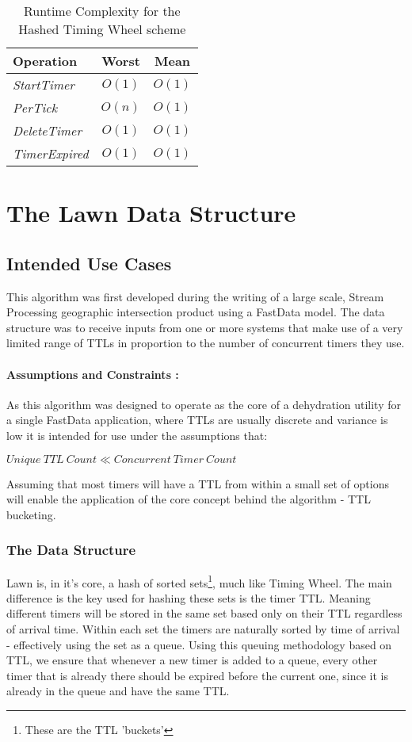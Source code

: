 \documentclass[twocolumn,a4paper]{article}
\newcommand{\advcomplexity}[9]{
\begin{table}[h!]
	\begin{center}
		\begin{tabular}{l|c|c}
			\textbf{Operation} & \textbf{Worst} & \textbf{Mean} \\
			\hline
			\textit{StartTimer} & $O(#1)$ & $O(#2)$ \\
			\textit{PerTick} & $O(#3)$ & $O(#4)$ \\
			\textit{DeleteTimer} & $O(#5)$ & $O(#6)$ \\
			\textit{TimerExpired} & $O(#7)$ & $O(#8)$ \\
		\end{tabular}
		\caption{Runtime Complexity for #9 scheme}
		\label{tab:table1}
	\end{center}
\end{table}
}
\begin{document}
\advcomplexity{1}{1}{n}{1}{1}{1}{1}{1}{the Hashed Timing Wheel}


\section{The Lawn Data Structure}
 
\subsection{Intended Use Cases}

This algorithm was first developed during the writing of a large scale, Stream Processing geographic intersection product using a FastData\cite{GP} model. The data structure was to receive inputs from one or more systems that make use of a very limited range of TTLs in proportion to the number of concurrent timers they use. 

\paragraph{Assumptions and Constraints :}
As this algorithm was designed to operate as the core of a dehydration utility for a single  FastData application, where TTLs are usually discrete and variance is low it is intended for use under the assumptions that: 
\begin{center}
	$ Unique\ TTL\ Count \ll Concurrent\ Timer\ Count $
\end{center}
Assuming that most timers will have a TTL from within a small set of options will enable the application of the core concept behind the algorithm - TTL bucketing. 

\subsubsection{The Data Structure}
Lawn is, in it's core, a hash of sorted sets\footnote{These are the TTL 'buckets'}, much like Timing Wheel. The main difference is the key used for hashing these sets is the timer TTL. Meaning different timers will be stored in the same set based only on their TTL regardless of arrival time. Within each set the timers are naturally sorted by time  of arrival - effectively using the set as a queue. Using this queuing methodology based on TTL, we ensure that whenever a new timer is added to a queue, every other timer that is already there should be expired before the current one, since it is already in the queue and have the same TTL.
\end{document}
